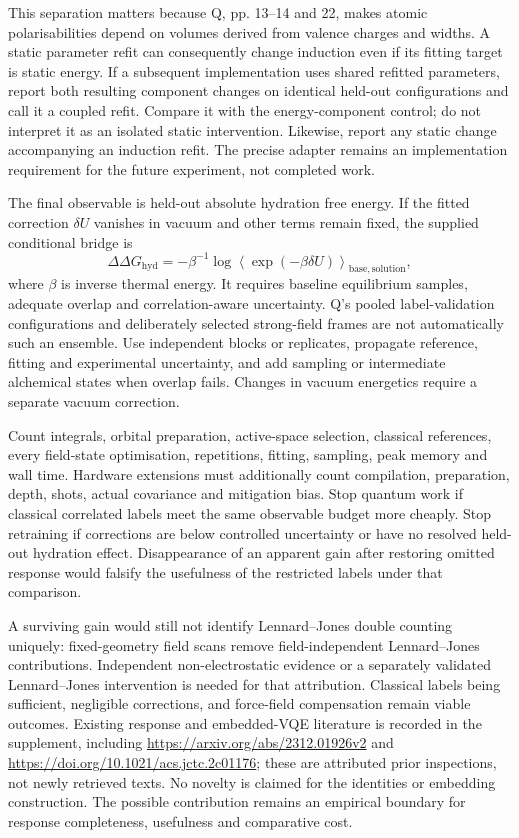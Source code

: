 \documentclass{article}
\begin{document}
This separation matters because Q, pp. 13--14 and 22, makes atomic polarisabilities depend on volumes derived from valence charges and widths. A static parameter refit can consequently change induction even if its fitting target is static energy. If a subsequent implementation uses shared refitted parameters, report both resulting component changes on identical held-out configurations and call it a coupled refit. Compare it with the energy-component control; do not interpret it as an isolated static intervention. Likewise, report any static change accompanying an induction refit. The precise adapter remains an implementation requirement for the future experiment, not completed work.

The final observable is held-out absolute hydration free energy. If the fitted correction $\delta U$ vanishes in vacuum and other terms remain fixed, the supplied conditional bridge is
\begin{equation*}
\Delta\Delta G_{\mathrm{hyd}}=-\beta^{-1}\log\left\langle\exp(-\beta\delta U)\right\rangle_{\mathrm{base,solution}},
\end{equation*}
where $\beta$ is inverse thermal energy. It requires baseline equilibrium samples, adequate overlap and correlation-aware uncertainty. Q's pooled label-validation configurations and deliberately selected strong-field frames are not automatically such an ensemble. Use independent blocks or replicates, propagate reference, fitting and experimental uncertainty, and add sampling or intermediate alchemical states when overlap fails. Changes in vacuum energetics require a separate vacuum correction.

Count integrals, orbital preparation, active-space selection, classical references, every field-state optimisation, repetitions, fitting, sampling, peak memory and wall time. Hardware extensions must additionally count compilation, preparation, depth, shots, actual covariance and mitigation bias. Stop quantum work if classical correlated labels meet the same observable budget more cheaply. Stop retraining if corrections are below controlled uncertainty or have no resolved held-out hydration effect. Disappearance of an apparent gain after restoring omitted response would falsify the usefulness of the restricted labels under that comparison.

A surviving gain would still not identify Lennard--Jones double counting uniquely: fixed-geometry field scans remove field-independent Lennard--Jones contributions. Independent non-electrostatic evidence or a separately validated Lennard--Jones intervention is needed for that attribution. Classical labels being sufficient, negligible corrections, and force-field compensation remain viable outcomes. Existing response and embedded-VQE literature is recorded in the supplement, including \url{https://arxiv.org/abs/2312.01926v2} and \url{https://doi.org/10.1021/acs.jctc.2c01176}; these are attributed prior inspections, not newly retrieved texts. No novelty is claimed for the identities or embedding construction. The possible contribution remains an empirical boundary for response completeness, usefulness and comparative cost.
\end{document}
